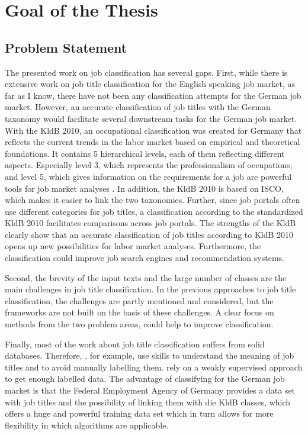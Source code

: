 \documentclass[a4paper]{article}
\begin{document}
\section{Goal of the Thesis}
\subsection{Problem Statement}
The presented work on job classification has several gaps. First, while there is extensive work on job title classification for the English speaking job market, as far as I know, there have not been any classification attempts for the German job market. However, an accurate classification of job titles with the German taxonomy would facilitate several downstream tasks for the German job market. With the KldB 2010, an occupational classification was created for Germany that reflects the current trends in the labor market based on empirical and theoretical foundations. It contains 5 hierarchical levels, each of them reflecting different aspects. Especially level 3, which represents the professionalism of occupations, and level 5, which gives information on the requirements for a job are powerful tools for job market analyses \citep{Paulus2013}. In addition, the KldB 2010 is based on ISCO, which makes it easier to link the two taxonomies. Further, since job portals often use different categories for job titles, a classification according to the standardized KldB 2010 facilitates comparisons across job portals. The strengths of the KldB clearly show that an accurate classification of job titles according to KldB 2010 opens up new possibilities for labor market analyses. Furthermore, the classification could improve job search engines and recommendation systems. 

Second, the brevity of the input texts and the large number of classes are the main challenges in job title classification. In the previous approaches to job title classification, the challenges are partly mentioned and considered, but the frameworks are not built on the basis of these challenges. A clear focus on methods from the two problem areas, could help to improve classification.  

Finally, most of the work about job title classification suffers from solid databases. Therefore, \cite{Decorte2021}, for example, use skills to understand the meaning of job titles and to avoid manually labelling them. \cite{Javed2015} rely on a weakly supervised approach to get enough labelled data. The advantage of classifying for the German job market is that the Federal Employment Agency of Germany provides a data set with job titles and the possibility of linking them with die KldB classes, which offers a huge and powerful training data set which in turn allows for more flexibility in which algorithms are applicable.
\end{document}
